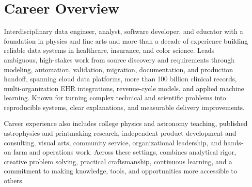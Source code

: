 \section{Career Overview}
\label{sec:profile}

Interdisciplinary data engineer, analyst, software developer, and educator with a foundation in physics and fine arts and more than a decade of experience building reliable data systems in healthcare, insurance, and color science. Leads ambiguous, high-stakes work from source discovery and requirements through modeling, automation, validation, migration, documentation, and production handoff, spanning cloud data platforms, more than 100 billion clinical records, multi-organization EHR integrations, revenue-cycle models, and applied machine learning. Known for turning complex technical and scientific problems into reproducible systems, clear explanations, and measurable delivery improvements.

Career experience also includes college physics and astronomy teaching, published astrophysics and printmaking research, independent product development and consulting, visual arts, community service, organizational leadership, and hands-on farm and operations work. Across these settings, combines analytical rigor, creative problem solving, practical craftsmanship, continuous learning, and a commitment to making knowledge, tools, and opportunities more accessible to others.

